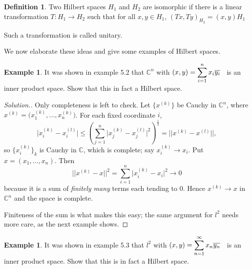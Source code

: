 \documentclass[11pt,a4paper]{article}
\theoremstyle{definition}
\newtheorem{defn}[thm]{Definition}
\newtheorem{exa}[thm]{Example}
\newenvironment{solution}
  {\renewcommand{\qedsymbol}{}\begin{proof}[\textit{Solution}.]}
  {\end{proof}}
\begin{document}
\begin{defn}
Two Hilbert spaces $H_1$ and $H_2$ are isomorphic if there is a linear transformation $T:H_1\rightarrow H_2$ such that for all $x,y\in H_1$\hspace{0.1cm},\hspace{0.2cm} $(Tx,Ty)_{H_2}=(x,y)H_1$


Such a transformation is called unitary.


\end{defn}
We now elaborate these ideas and give some examples of Hilbert spaces.


\begin{exa}
It was shown in example 5.2 that $\mathbb{C}^n$ with \hspace{0.2cm}$\displaystyle{(x,y)=\sum^n_{i=1}x_i\overline{y_i}}\hspace{0.2cm}$ is an inner product space. Show that this in fact a Hilbert space.


\end{exa}

\begin{solution}
Only completeness is left to check. Let $\{x^{(k)}\}$ be Cauchy in
$\mathbb{C}^n$, where $x^{(k)}=\big(x^{(k)}_1,\dots,x^{(k)}_n\big)$. For each
fixed coordinate $i$,
$$\big|x^{(k)}_i-x^{(l)}_i\big|\leq
\left(\sum_{j=1}^{n}\big|x^{(k)}_j-x^{(l)}_j\big|^2\right)^{\frac12}
=||x^{(k)}-x^{(l)}|| ,$$
so $\{x^{(k)}_i\}_k$ is Cauchy in $\mathbb{C}$, which is complete; say
$x^{(k)}_i\rightarrow x_i$. Put $x=(x_1,\dots,x_n)$. Then
$$||x^{(k)}-x||^2=\sum_{i=1}^{n}\big|x^{(k)}_i-x_i\big|^2\rightarrow 0$$
because it is a sum of \emph{finitely many} terms each tending to $0$. Hence
$x^{(k)}\rightarrow x$ in $\mathbb{C}^n$ and the space is complete.

Finiteness of the sum is what makes this easy; the same argument for $l^2$ needs
more care, as the next example shows.
\end{solution}


\begin{exa}
It was shown in example 5.3 that $l^2$ with \hspace{0.2cm}$\displaystyle{(x,y)=\sum^{\infty}_{n=1}x_n\overline{y_n}}\hspace{0.2cm}$ is an inner product space. Show that this is in fact a Hilbert space.


\end{exa}
\end{document}
